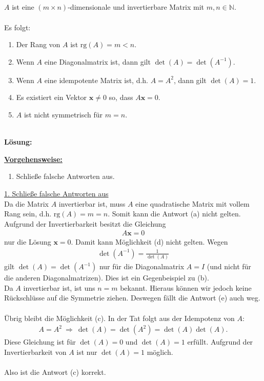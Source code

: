 \newpage
\subsection*{}
$A$ ist eine $(m \times n)$-dimensionale und invertierbare Matrix mit $m,n \in \mathbb{N}$.\\
\\
Es folgt:
\renewcommand{\labelenumi}{(\alph{enumi})}
\begin{enumerate}
	\item 
	Der Rang von $A$ ist $\mathrm{rg}(A) = m < n$.
	\item 
	Wenn $A$ eine Diagonalmatrix ist, dann gilt $\det(A) = \det(A^{-1})$.
	\item 
	Wenn $A$ eine idempotente Matrix ist, d.h. $A = A^2$, dann gilt $\det(A) = 1$.
	\item 
	Es existiert ein Vektor $\mathbf{x} \neq 0$ so, dass $A \mathbf{x} = 0$.
	\item 
	$A$ ist nicht symmetrisch  für $m=n$. 
\end{enumerate}
\ \\
\textbf{Lösung:}
\begin{mdframed}
\underline{\textbf{Vorgehensweise:}}
\renewcommand{\labelenumi}{\theenumi.}
\begin{enumerate}
\item Schließe falsche Antworten aus.
\end{enumerate}
\end{mdframed}

\underline{1. Schließe falsche Antworten aus}\\
Da die Matrix $A$ invertierbar ist, muss $A$ eine quadratische Matrix mit vollem Rang sein, d.h. $\mathrm{rg}(A) = m= n$. Somit kann die Antwort (a) nicht gelten.
Aufgrund der Invertierbarkeit besitzt die Gleichung
\begin{align*}
	A \mathbf{x} = 0
\end{align*} 
nur die Lösung $\mathbf{x} = 0$. Damit kann Möglichkeit (d) nicht gelten.
Wegen 
\begin{align*}
	\det(A^{-1}) = \frac{1}{\det(A)}
\end{align*}
gilt $\det(A) = \det(A^{-1})$ nur für die Diagonalmatrix $A = I$ (und nicht für die anderen Diagonalmatrizen). Dies ist ein Gegenbeispiel zu (b).\\
Da $A$ invertierbar ist, ist uns $n = m$ bekannt. Hieraus können wir jedoch keine Rückschlüsse auf die Symmetrie ziehen. Deswegen fällt die Antwort (e) auch weg.\\
\\
Übrig bleibt die Möglichkeit (c). In der Tat folgt aus der Idempotenz von $A$:
\begin{align*}
	A = A^2 
	\ \Rightarrow \
	\det(A) = \det(A^2) = \det(A) \det(A).
\end{align*}
Diese Gleichung ist für $\det(A) = 0$ und $\det(A) = 1$ erfüllt.
Aufgrund der Invertierbarkeit von $A$ ist nur $\det(A) = 1$ möglich. \\
\\
Also ist die Antwort (c) korrekt.




